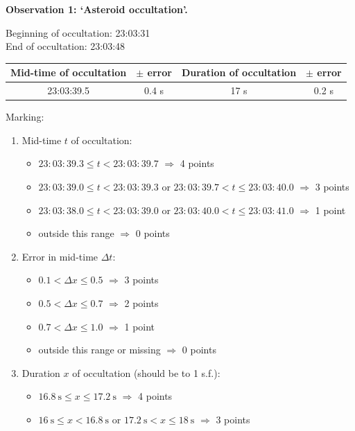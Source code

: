 \textbf{Observation 1: `Asteroid occultation'.}

Beginning of occultation: 23:03:31\\
End of occultation: 23:03:48

\begin{center}
\begin{tabular}{c|c|c|c}
Mid-time of occultation & $\pm$ error & Duration of occultation & $\pm$ error \\
\hline
23:03:39.5 & 0.4 s & 17 s & 0.2 s \\
\end{tabular}
\end{center}

Marking:
\begin{enumerate}
\item Mid-time $t$ of occultation:
  \begin{itemize}
  \item $23{:}03{:}39.3 \le t < 23{:}03{:}39.7$ $\Longrightarrow$ 4 points
  \item $23{:}03{:}39.0 \le t < 23{:}03{:}39.3$ or
    $23{:}03{:}39.7 < t \le 23{:}03{:}40.0$ $\Longrightarrow$ 3 points
  \item $23{:}03{:}38.0 \le t < 23{:}03{:}39.0$ or
    $23{:}03{:}40.0 < t \le 23{:}03{:}41.0$ $\Longrightarrow$ 1 point
  \item outside this range $\Longrightarrow$ 0 points
  \end{itemize}
\item Error in mid-time $\Delta t$:
  \begin{itemize}
  \item $0.1 < \Delta x \le 0.5$ $\Longrightarrow$ 3 points
  \item $0.5 < \Delta x \le 0.7$ $\Longrightarrow$ 2 points
  \item $0.7 < \Delta x \le 1.0$ $\Longrightarrow$ 1 point
  \item outside this range or missing $\Longrightarrow$ 0 points
  \end{itemize}
\item Duration $x$ of occultation (should be to 1 s.f.):
  \begin{itemize}
  \item $16.8~\mathrm{s} \le x \le 17.2~\mathrm{s}$ $\Longrightarrow$ 4 points
  \item $16~\mathrm{s} \le x < 16.8~\mathrm{s}$ or
    $17.2~\mathrm{s} < x \le 18~\mathrm{s}$ $\Longrightarrow$ 3 points

\end{itemize}
\end{enumerate}

